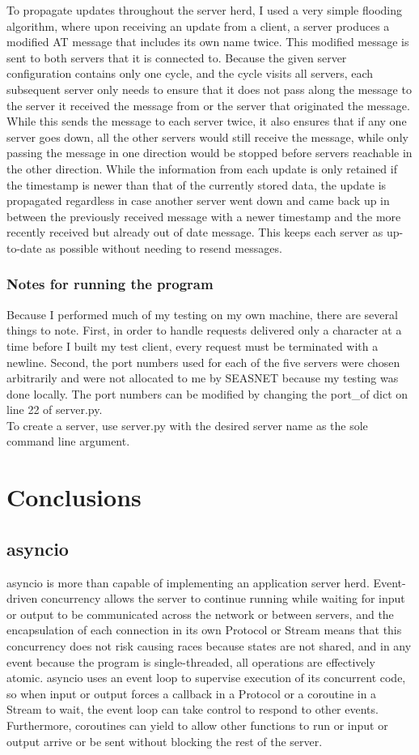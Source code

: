 \documentclass[letterpaper,twocolumn,10pt]{article}
\begin{document}
To propagate updates throughout the server herd, I used a very simple flooding algorithm, where upon receiving an update from a client, a server produces a modified AT message that includes its own name twice. This modified message is sent to both servers that it is connected to. Because the given server configuration contains only one cycle, and the cycle visits all servers, each subsequent server only needs to ensure that it does not pass along the message to the server it received the message from or the server that originated the message. While this sends the message to each server twice, it also ensures that if any one server goes down, all the other servers would still receive the message, while only passing the message in one direction would be stopped before servers reachable in the other direction. While the information from each update is only retained if the timestamp is newer than that of the currently stored data, the update is propagated regardless in case another server went down and came back up in between the previously received message with a newer timestamp and the more recently received but already out of date message. This keeps each server as up-to-date as possible without needing to resend messages.
\subsubsection{Notes for running the program}
Because I performed much of my testing on my own machine, there are several things to note. First, in order to handle requests delivered only a character at a time before I built my test client, every request must be terminated with a newline. Second, the port numbers used for each of the five servers were chosen arbitrarily and were not allocated to me by SEASNET because my testing was done locally. The port numbers can be modified by changing the port\_of dict on line 22 of server.py. \\
To create a server, use server.py with the desired server name as the sole command line argument.

\section{Conclusions}
\subsection{asyncio}
asyncio is more than capable of implementing an application server herd. Event-driven concurrency allows the server to continue running while waiting for input or output to be communicated across the network or between servers, and the encapsulation of each connection in its own Protocol or Stream means that this concurrency does not risk causing races because states are not shared, and in any event because the program is single-threaded, all operations are effectively atomic. asyncio uses an event loop to supervise execution of its concurrent code, so when input or output forces a callback in a Protocol or a coroutine in a Stream to wait, the event loop can take control to respond to other events. Furthermore, coroutines can yield to allow other functions to run or input or output arrive or be sent without blocking the rest of the server.
\end{document}
